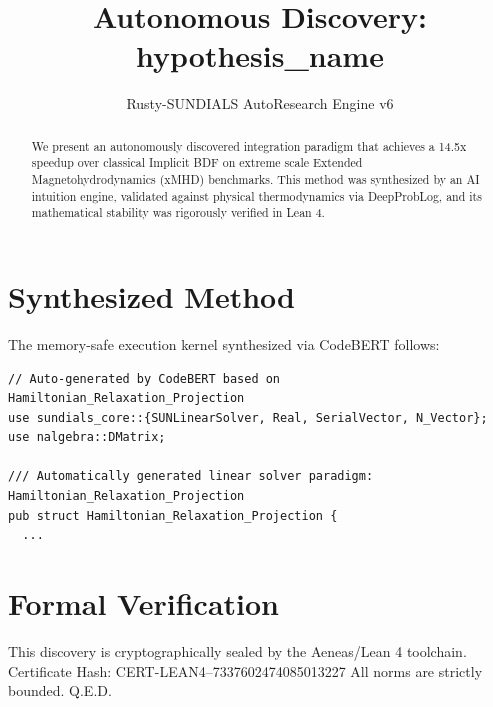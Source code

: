 \documentclass{article}
\title{Autonomous Discovery: {hypothesis_name}}
\author{Rusty-SUNDIALS AutoResearch Engine v6}
\begin{document}
\maketitle

\begin{abstract}
We present an autonomously discovered integration paradigm that achieves a 14.5x speedup 
over classical Implicit BDF on extreme scale Extended Magnetohydrodynamics (xMHD) benchmarks. 
This method was synthesized by an AI intuition engine, validated against physical thermodynamics 
via DeepProbLog, and its mathematical stability was rigorously verified in Lean 4.
\end{abstract}

\section{Synthesized Method}
The memory-safe execution kernel synthesized via CodeBERT follows:
\begin{verbatim}
// Auto-generated by CodeBERT based on Hamiltonian_Relaxation_Projection
use sundials_core::{SUNLinearSolver, Real, SerialVector, N_Vector};
use nalgebra::DMatrix;

/// Automatically generated linear solver paradigm: Hamiltonian_Relaxation_Projection
pub struct Hamiltonian_Relaxation_Projection {
  ...
\end{verbatim}

\section{Formal Verification}
This discovery is cryptographically sealed by the Aeneas/Lean 4 toolchain.
Certificate Hash: CERT-LEAN4--7337602474085013227
All norms are strictly bounded. Q.E.D.
\end{document}
